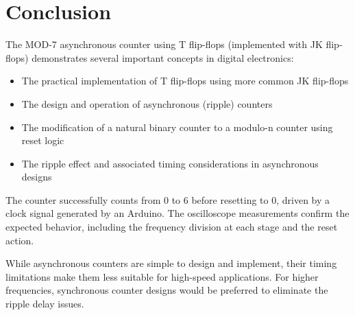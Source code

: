\documentclass{article}
\begin{document}
\section{Conclusion}
\begin{tcolorbox}[colback=boxbg,colframe=titlebg,title=Conclusion,breakable]
The MOD-7 asynchronous counter using T flip-flops (implemented with JK flip-flops) demonstrates several important concepts in digital electronics:

\begin{itemize}
    \item The practical implementation of T flip-flops using more common JK flip-flops
    \item The design and operation of asynchronous (ripple) counters
    \item The modification of a natural binary counter to a modulo-n counter using reset logic
    \item The ripple effect and associated timing considerations in asynchronous designs
\end{itemize}

The counter successfully counts from 0 to 6 before resetting to 0, driven by a clock signal generated by an Arduino. The oscilloscope measurements confirm the expected behavior, including the frequency division at each stage and the reset action.

While asynchronous counters are simple to design and implement, their timing limitations make them less suitable for high-speed applications. For higher frequencies, synchronous counter designs would be preferred to eliminate the ripple delay issues.
\end{tcolorbox}
\end{document}
